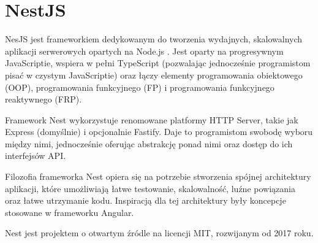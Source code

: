 \section{NestJS}


NesJS jest frameworkiem dedykowanym do tworzenia wydajnych, skalowalnych aplikacji serwerowych opartych na Node.js \cite{nestjsDocumentationNestJS}.
Jest oparty na progresywnym JavaScriptie, wspiera w pełni TypeScript (pozwalając jednocześnie programistom pisać w czystym JavaScriptie) oraz łączy elementy programowania obiektowego (OOP), programowania funkcyjnego (FP) i programowania funkcyjnego reaktywnego (FRP).

Framework Nest wykorzystuje renomowane platformy HTTP Server, takie jak Express (domyślnie) i opcjonalnie Fastify.
Daje to programistom swobodę wyboru między nimi, jednocześnie oferując abstrakcję ponad nimi oraz dostęp do ich interfejsów API.

Filozofia frameworka Nest opiera się na potrzebie stworzenia spójnej architektury aplikacji, które umożliwiają łatwe testowanie, skalowalność, luźne powiązania oraz łatwe utrzymanie kodu.
Inspiracją dla tej architektury były koncepcje stosowane w frameworku Angular.

Nest jest projektem o otwartym źródle na licencji MIT, rozwijanym od 2017 roku.